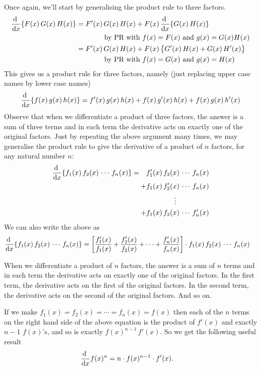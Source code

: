 \begin{eg}\label{eg:DIFFsimpleToolsA}
Once again, we'll start by generalising the product rule to three factors.
\begin{align*}
\diff{}{x}\{F(x)\,G(x)\,H(x)\}
   &=F'(x)\,G(x)\,H(x)
    +F(x)\, \diff{}{x}\{G(x)\,H(x)\} \\
   &\qquad\qquad\text{by \prod\ with $f(x)=F(x)$ and $g(x)=G(x)H(x)$} \\
   &=F'(x)\,G(x)\,H(x)
    +F(x)\, \big\{G'(x)\,H(x)+G(x)\,H'(x)\big\} \\
   &\qquad\qquad\text{by \prod\ with $f(x)=G(x)$ and $g(x)=H(x)$}
\end{align*}
This gives us a product rule for three factors, namely (just replacing
upper case names by lower case names)
\begin{align*}
\diff{}{x}\{f(x)\,g(x)\,h(x)\}
 = f'(x)\,g(x)\,h(x)
    +f(x)\,g'(x)\,h(x)+f(x)\,g(x)\,h'(x)
\end{align*}
Observe that when we differentiate a product of three factors, the answer
is a sum of three terms and in each term the derivative acts on exactly
one of the original factors. Just by repeating the above argument many
times, we may generalise the product rule to give the derivative of a product
of $n$ factors, for any natural number $n$:
\begin{align*}
\begin{split}
\diff{}{x}\{f_1(x)\,f_2(x)\,\cdots\,f_n(x)\}
 =\quad &f'_1(x)\,f_2(x)\,\cdots\,f_n(x) \\
  +&f_1(x)\,f'_2(x)\,\cdots\,f_n(x) \\
   &\qquad \qquad\vdots \\
  +&f_1(x)\,f_2(x)\,\cdots\,f'_n(x)
\end{split}
\end{align*}
We can also write the above as
\begin{align*}
\diff{}{x}\{f_1(x)\,f_2(x)\,\cdots\,f_n(x)\}
&=
\left[
\frac{f_1'(x)}{f_1(x)}+
\frac{f_2'(x)}{f_2(x)}+
\cdots
+\frac{f_n'(x)}{f_n(x)}
\right]
\cdot   f_1(x)\,f_2(x)\,\cdots\,f_n(x)
\end{align*}

When we differentiate a product of $n$ factors, the answer
is a sum of $n$ terms and in each term the derivative acts on exactly
one of the original factors. In the first term, the derivative acts on
the first of the original factors. In the second term, the derivative acts on
the second of the original factors. And so on.

If we make $f_1(x) = f_2(x) = \cdots = f_n(x) = f(x)$ then each of the
$n$ terms on the right hand side of the above equation is the
product of $f'(x)$ and exactly $n-1$ $f(x)$'s, and so is exactly
$f(x)^{n-1}\,f'(x)$. So we get the following useful result
\begin{align*}
  \diff{}{x} f(x)^n &= n\cdot  f(x)^{n-1} \cdot  f'(x).
\end{align*}
\end{eg}

